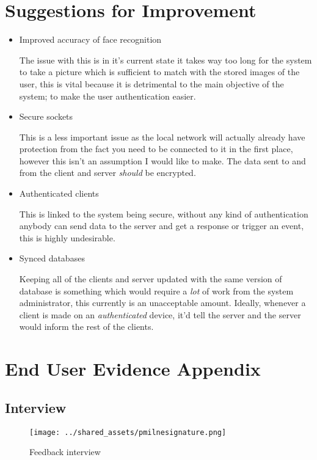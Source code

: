 \documentclass[a4paper]{article}
\begin{document}
\section{Suggestions for Improvement}

	\begin{itemize}
		\item Improved accuracy of face recognition

			The issue with this is in it's current state it takes way too long for the system to take a picture which is sufficient to match with the stored
			images of the user, this is vital because it is detrimental to the main objective of the system; to make the user authentication easier.

		\item Secure sockets

			This is a less important issue as the local network will actually already have protection from the fact you need to be connected to it in the first place,
			however this isn't an assumption I would like to make. The data sent to and from the client and server \textit{should} be encrypted.

		\item Authenticated clients 

			This is linked to the system being secure, without any kind of authentication anybody can send data to the server and get a response or trigger an event, this
			is highly undesirable.

		\item Synced databases

			Keeping all of the clients and server updated with the same version of database is something which would require a \textit{lot} of work from the system administrator,
			this currently is an unacceptable amount. Ideally, whenever a client is made on an \textit{authenticated} device, it'd tell the server and the server would inform the
			rest of the clients.

	\end{itemize}	

\section{End User Evidence Appendix}

	\subsection{Interview}

		\begin{figure}
			\caption{Feedback interview}
			\label{lst:interview}
			
			\texttt{[image: ../shared\_assets/pmilnesignature.png]}
		\end{figure}
\end{document}
